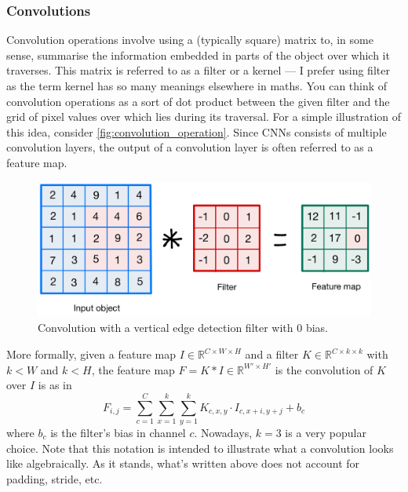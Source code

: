 \documentclass[11pt]{article}
\begin{document}
\subsubsection{Convolutions}
Convolution operations involve using a (typically square) matrix to, in some sense, summarise the information embedded in parts of the object over which it traverses. This matrix is referred to as a filter or a kernel — I prefer using filter as the term kernel has so many meanings elsewhere in maths. You can think of convolution operations as a sort of dot product between the given filter and the grid of pixel values over which lies during its traversal. For a simple illustration of this idea, consider \autoref{fig:convolution_operation}. Since CNNs consists of multiple convolution layers, the output of a convolution layer is often referred to as a feature map.

\begin{figure}[t]
    \centering
    \begin{minipage}{0.63\linewidth}
        \includegraphics[width=\textwidth]{./figures/neural_nets/CNN_convolution.pdf}
    \end{minipage}%
    \hfill
    \begin{minipage}{0.35\linewidth}
        \caption{Convolution with a vertical edge detection filter with 0 bias.}
        \label{fig:convolution_operation}
    \end{minipage}
\end{figure}

More formally, given a feature map $I\in\mathbb{R}^{C\times W\times H}$ and a filter $K\in\mathbb{R}^{C\times k\times k}$ with $k<W$ and $k<H$, the feature map $F=K*I\in\mathbb{R}^{W'\times H'}$ is the convolution of $K$ over $I$ is as in
$$
F_{i,j}
=
\sum_{c=1}^C\sum_{x=1}^{k}\sum_{y=1}^{k}K_{c,x,y}\cdot I_{c,x+i,y+j}+b_c
$$
where $b_c$ is the filter's bias in channel $c$. Nowadays, $k=3$ is a very popular choice. Note that this notation is intended to illustrate what a convolution looks like algebraically. As it stands, what's written above does not account for padding, stride, etc.
\end{document}
